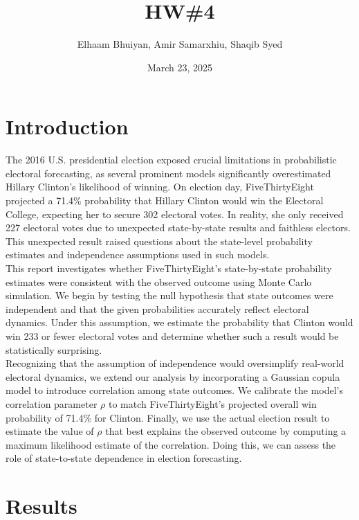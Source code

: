 \documentclass{report}
\title{HW\#4}
\author{
Elhaam Bhuiyan,
Amir Samarxhiu,
Shaqib Syed
}
\date{March 23, 2025}
\begin{document}
\maketitle

\section*{Introduction}
The 2016 U.S. presidential election exposed crucial limitations in probabilistic electoral forecasting, as several prominent models significantly overestimated Hillary Clinton's likelihood of winning. On election day, FiveThirtyEight projected a 71.4\% probability that Hillary Clinton would win the Electoral College, expecting her to secure 302 electoral votes. In reality, she only received 227 electoral votes due to unexpected state-by-state results and faithless electors. This unexpected result raised questions about the state-level probability estimates and independence assumptions used in such models. \\

This report investigates whether FiveThirtyEight’s state-by-state probability estimates were consistent with the observed outcome using Monte Carlo simulation. We begin by testing the null hypothesis that state outcomes were independent and that the given probabilities accurately reflect electoral dynamics. Under this assumption, we estimate the probability that Clinton would win 233 or fewer electoral votes and determine whether such a result would be statistically surprising. \\

Recognizing that the assumption of independence would oversimplify real-world electoral dynamics, we extend our analysis by incorporating a Gaussian copula model to introduce correlation among state outcomes. We calibrate the model's correlation parameter $\rho$ to match FiveThirtyEight's projected overall win probability of 71.4\% for Clinton. Finally, we use the actual election result to estimate the value of $\rho$ that best explains the observed outcome by computing a maximum likelihood estimate of the correlation. Doing this, we can assess the role of state-to-state dependence in election forecasting.
\section*{Results}
\end{document}

